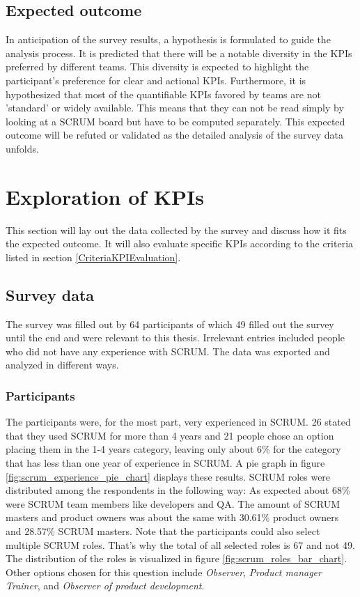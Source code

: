 \subsection{Expected outcome}
In anticipation of the survey results, 
a hypothesis is formulated to guide the analysis process. 
It is predicted that there will be a notable diversity in the 
KPIs preferred by different teams. 
This diversity is expected to highlight the participant's 
preference for clear and actional KPIs. Furthermore, 
it is hypothesized that most of the quantifiable KPIs 
favored by teams are not 'standard' or widely available. 
This means that they can not be read simply by looking at a 
SCRUM board but have to be computed separately.
This expected outcome will be refuted or validated as the 
detailed analysis of the survey data unfolds. 

\newpage

\section{Exploration of KPIs}

This section will lay out the data collected by the survey and discuss how it fits the expected outcome. It will also evaluate specific KPIs according to the criteria listed in section \ref{CriteriaKPIEvaluation}.

\subsection{Survey data}\label{kpi-survey-results}

The survey was filled out by 64 participants of which 49 filled out the survey until the end and were relevant to this thesis. Irrelevant entries included people who did not have any experience with SCRUM. The data was exported and analyzed in different ways.

\subsubsection{Participants}

The participants were, for the most part, very experienced in SCRUM. 
26 stated that they used SCRUM for more than 4 years and 21 people chose an option placing them in the 1-4 years category, 
leaving only about 6\% for the category that has less than one year of experience in SCRUM. 
A pie graph in figure \ref{fig:scrum_experience_pie_chart} displays these results. 
SCRUM roles were distributed among the respondents in the following way: 
As expected about 68\% were SCRUM team members like developers and QA. 
The amount of SCRUM masters and product owners was about the same with 30.61\% product owners and 28.57\% 
SCRUM masters. 
Note that the participants could also select multiple SCRUM roles. 
That's why the total of all selected roles is 67 and not 49. 
The distribution of the roles is visualized in figure \ref{fig:scrum_roles_bar_chart}. 
Other options chosen for this question include \textit{Observer}, \textit{Product manager} \textit{Trainer}, and \textit{Observer of product development}.

